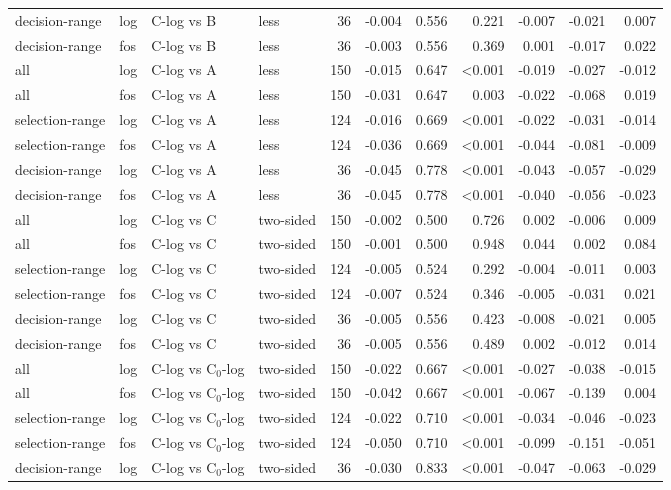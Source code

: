 \begin{longtable}{llllrrrrrrr}
decision-range & log & C-log vs B & less & 36 & -0.004 & 0.556 & 0.221 & -0.007 & -0.021 & 0.007 \\
decision-range & fos & C-log vs B & less & 36 & -0.003 & 0.556 & 0.369 & 0.001 & -0.017 & 0.022 \\
all & log & C-log vs A & less & 150 & -0.015 & 0.647 & <0.001 & -0.019 & -0.027 & -0.012 \\
all & fos & C-log vs A & less & 150 & -0.031 & 0.647 & 0.003 & -0.022 & -0.068 & 0.019 \\
selection-range & log & C-log vs A & less & 124 & -0.016 & 0.669 & <0.001 & -0.022 & -0.031 & -0.014 \\
selection-range & fos & C-log vs A & less & 124 & -0.036 & 0.669 & <0.001 & -0.044 & -0.081 & -0.009 \\
decision-range & log & C-log vs A & less & 36 & -0.045 & 0.778 & <0.001 & -0.043 & -0.057 & -0.029 \\
decision-range & fos & C-log vs A & less & 36 & -0.045 & 0.778 & <0.001 & -0.040 & -0.056 & -0.023 \\
all & log & C-log vs C & two-sided & 150 & -0.002 & 0.500 & 0.726 & 0.002 & -0.006 & 0.009 \\
all & fos & C-log vs C & two-sided & 150 & -0.001 & 0.500 & 0.948 & 0.044 & 0.002 & 0.084 \\
selection-range & log & C-log vs C & two-sided & 124 & -0.005 & 0.524 & 0.292 & -0.004 & -0.011 & 0.003 \\
selection-range & fos & C-log vs C & two-sided & 124 & -0.007 & 0.524 & 0.346 & -0.005 & -0.031 & 0.021 \\
decision-range & log & C-log vs C & two-sided & 36 & -0.005 & 0.556 & 0.423 & -0.008 & -0.021 & 0.005 \\
decision-range & fos & C-log vs C & two-sided & 36 & -0.005 & 0.556 & 0.489 & 0.002 & -0.012 & 0.014 \\
all & log & C-log vs C$_0$-log & two-sided & 150 & -0.022 & 0.667 & <0.001 & -0.027 & -0.038 & -0.015 \\
all & fos & C-log vs C$_0$-log & two-sided & 150 & -0.042 & 0.667 & <0.001 & -0.067 & -0.139 & 0.004 \\
selection-range & log & C-log vs C$_0$-log & two-sided & 124 & -0.022 & 0.710 & <0.001 & -0.034 & -0.046 & -0.023 \\
selection-range & fos & C-log vs C$_0$-log & two-sided & 124 & -0.050 & 0.710 & <0.001 & -0.099 & -0.151 & -0.051 \\
decision-range & log & C-log vs C$_0$-log & two-sided & 36 & -0.030 & 0.833 & <0.001 & -0.047 & -0.063 & -0.029 \\

\end{longtable}
